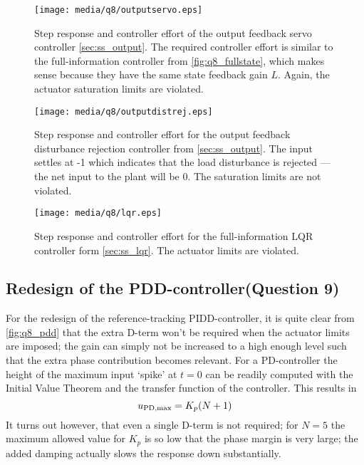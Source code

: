 \begin{figure}[ht!]
    \centering
    \texttt{[image: media/q8/outputservo.eps]}
    \caption{Step response and controller effort of the output feedback servo controller \cref{sec:ss_output}. The required controller effort is similar to the full-information controller from \cref{fig:q8_fullstate}, which makes sense because they have the same state feedback gain $L$. Again, the actuator saturation limits are violated.}
    \label{fig:q8_outputservo}
\end{figure}

\begin{figure}[ht!]
    \centering
    \texttt{[image: media/q8/outputdistrej.eps]}
    \caption{Step response and controller effort for the output feedback disturbance rejection controller from \cref{sec:ss_output}. The input settles at -1 which indicates that the load disturbance is rejected --- the net input to the plant will be 0. The saturation limits are not violated.}
    \label{fig:q8_outputdistrej}
\end{figure}
\FloatBarrier
\begin{figure}[ht!]
    \centering
    \texttt{[image: media/q8/lqr.eps]}
    \caption{Step response and controller effort for the full-information LQR controller form \cref{sec:ss_lqr}. The actuator limits are violated.}
    \label{fig:q8_lqr}
\end{figure}
\subsection{Redesign of the PDD-controller\textnormal{\phantom{xxx}(Question 9)}}
\label{sec:retunepid}
For the redesign of the reference-tracking PIDD-controller, it is quite clear from \cref{fig:q8_pdd} that the extra D-term won't be required when the actuator limits are imposed; the gain can simply not be increased to a high enough level such that the extra phase contribution becomes relevant. For a PD-controller the height of the maximum input `spike' at $t=0$ can be readily computed with the Initial Value Theorem and the transfer function of the controller. This results in
$$ u_{\text{PD,max}} = K_p\qty(N + 1)$$
It turns out however, that even a single D-term is not required; for $N = 5$ the maximum allowed value for $K_p$ is so low that the phase margin is very large; the added damping actually slows the response down substantially. 

